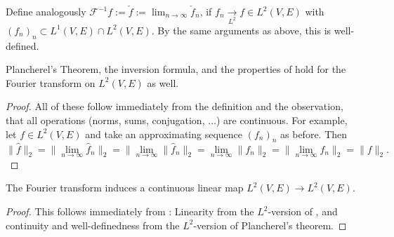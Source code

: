 \begin{definition}
  \label{def:invFourier-L2}
  \lean{}
  Define analogously $\mathcal F^{-1}f:=\check f:=\lim_{n\to\infty}\check f_n$, if $f_n\xrightarrow[L^2]{}f\in L^2(V,E)$
  with $(f_n)_n\subset L^1(V,E)\cap L^2(V,E)$. By the same arguments as above, this is well-defined.
\end{definition}

\begin{corollary}
  \label{thm:fourier2-properties}
  \lean{}
  Plancherel's Theorem, the inversion formula, and the properties of  hold
  for the Fourier transform on $L^2(V,E)$ as well.
\end{corollary}
\begin{proof}
  All of these follow immediately from the definition and the observation, that all operations (norms, sums, conjugation, $\ldots$) are continuous.
  For example, let $f\in L^2(V,E)$ and take an approximating sequence $(f_n)_n$ as before. Then
  $$\|\widehat f\|_2=\|\lim_{n\to\infty}\widehat f_n\|_2=\|\lim_{n\to\infty}\|\widehat f_n\|_2=\lim_{n\to\infty}\|f_n\|_2
  =\|\lim_{n\to\infty}f_n\|_2=\|f\|_2.$$
\end{proof}

\begin{corollary}
  \label{thm:fourier-is-l2-linear}
  \leanok %
  The Fourier transform induces a continuous linear map $L^2(V,E) \to L^2(V,E)$.
  \end{corollary}
  \begin{proof}
    This follows immediately from : Linearity from the $L^2$-version of
    , and continuity and well-definedness from the $L^2$-version of Plancherel's theorem.
\end{proof}